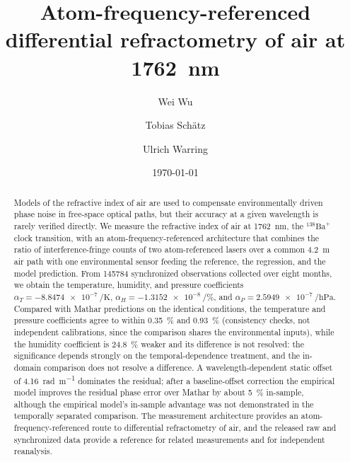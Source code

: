 \documentclass[aps,prapplied,reprint,groupedaddress,twocolumn,superscriptaddress,linenumbers]{revtex4-2}
\begin{document}
\preprint{}

\title{Atom-frequency-referenced differential refractometry of air at \SI{1762}{\nano\meter}}
\author{Wei Wu}
\author{Tobias Sch{\"a}tz}
\author{Ulrich Warring}

\date{\today}

\begin{abstract}
Models of the refractive index of air are used to compensate environmentally driven phase noise in free-space optical paths, but their accuracy at a given wavelength is rarely verified directly. We measure the refractive index of air at \SI{1762}{\nano\meter}, the $^{138}\mathrm{Ba}^+$ clock transition, with an atom-frequency-referenced architecture that combines the ratio of interference-fringe counts of two atom-referenced lasers over a common \SI{4.2}{\meter} air path with one environmental sensor feeding the reference, the regression, and the model prediction. From \num{145784} synchronized observations collected over eight months, we obtain the temperature, humidity, and pressure coefficients $\alpha_T = \SI{-8.8474e-7}{\per\kelvin}$, $\alpha_H = \SI{-1.3152e-8}{\per\percent}$, and $\alpha_P = \SI{+2.5949e-7}{\per\hecto\pascal}$. Compared with Mathar predictions on the identical conditions, the temperature and pressure coefficients agree to within \SI{0.35}{\percent} and \SI{0.93}{\percent} (consistency checks, not independent calibrations, since the comparison shares the environmental inputs), while the humidity coefficient is \SI{24.8}{\percent} weaker and its difference is not resolved: the significance depends strongly on the temporal-dependence treatment, and the in-domain comparison does not resolve a difference. A wavelength-dependent static offset of \SI{4.16}{\radian\per\meter} dominates the residual; after a baseline-offset correction the empirical model improves the residual phase error over Mathar by about \SI{5}{\percent} in-sample, although the empirical model's in-sample advantage was not demonstrated in the temporally separated comparison. The measurement architecture provides an atom-frequency-referenced route to differential refractometry of air, and the released raw and synchronized data provide a reference for related measurements and for independent reanalysis.
\end{abstract}
\end{document}
